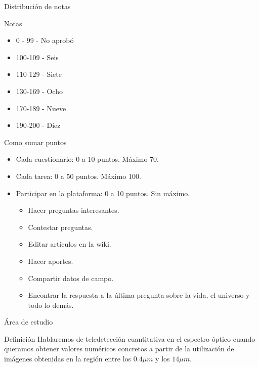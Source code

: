 \documentclass[handout]{beamer}
\begin{document}
\begin{frame}{Distribución de notas}
    \begin{block}{Notas}
        \begin{itemize}[<+->]
        \item 0 - 99 - No aprobó
        \item 100-109 - Seis
        \item 110-129 - Siete
        \item 130-169 - Ocho
        \item 170-189 - Nueve
        \item 190-200 - Diez
      \end{itemize}
    \end{block}
\end{frame}

\begin{frame}{Como sumar puntos}
  \begin{itemize}[<+->]
    \item Cada cuestionario: 0 a 10 puntos. Máximo 70.
    \item Cada tarea: 0 a 50 puntos. Máximo 100.
    \item Participar en la plataforma: 0 a 10 puntos. Sin máximo.
    \begin{itemize}
      \item Hacer preguntas interesantes.
      \item Contestar preguntas.
      \item Editar artículos en la wiki.
      \item Hacer aportes.
      \item Compartir datos de campo.
      \item Encontrar la respuesta a la última pregunta sobre la vida, el universo y todo lo demás.
    \end{itemize}
  \end{itemize}
\end{frame}

\begin{frame}{Área de estudio}
  \begin{block}{Definición}
    Hablaremos de teledetección cuantitativa en el espectro óptico cuando queramos obtener valores numéricos concretos a partir de la utilización de imágenes obtenidas en la región entre los $0.4\mu m$ y los $14\mu m$.
  \end{block}
\end{frame}
\end{document}
